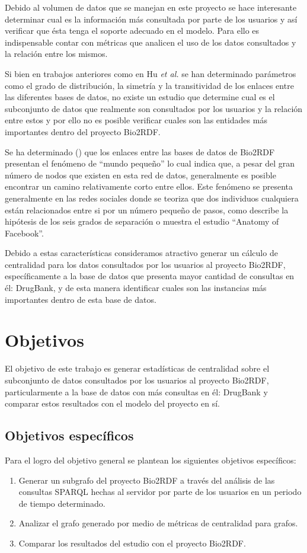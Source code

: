 Debido al volumen de datos que se manejan en este proyecto se hace interesante
determinar cual es la información más consultada por parte de los usuarios y 
así verificar que ésta tenga el soporte adecuado en el modelo. 
Para ello es indispensable contar con métricas que analicen el uso de los datos
consultados y la relación entre los mismos.

Si bien en trabajos anteriores como en Hu \emph{et al.}\cite{hu2015link} se han
determinado parámetros como el grado de distribución, la simetría y la
transitividad de los enlaces entre las diferentes bases de datos, no existe un
estudio que determine cual es el subconjunto de datos que realmente son
consultados por los usuarios y la relación entre estos y por ello no es posible
verificar cuales son las entidades más importantes dentro del proyecto Bio2RDF.

Se ha determinado (\hspace{1sp}\cite{hu2015link}) que los enlaces entre
las bases de datos de Bio2RDF presentan el fenómeno de ``mundo pequeño'' lo cual
indica que, a pesar del gran número de nodos que existen en esta red de datos,
generalmente es posible encontrar un camino relativamente corto entre ellos.
Este fenómeno se presenta generalmente en las redes sociales donde se
teoriza que dos individuos cualquiera están relacionados entre si por un número
pequeño de pasos, como describe la hipótesis de los seis grados de separación o
muestra el estudio ``Anatomy of Facebook''\cite{ugander2011anatomy}.

Debido a estas características consideramos atractivo generar un cálculo de
centralidad para los datos consultados por los usuarios al proyecto Bio2RDF,
específicamente a la base de datos que presenta mayor cantidad de consultas en
él: DrugBank, y de esta manera identificar cuales son las instancias más
importantes dentro de esta base de datos.

\section{Objetivos}

El objetivo de este trabajo es generar estadísticas de centralidad sobre el
subconjunto de datos consultados por los usuarios al proyecto Bio2RDF,
particularmente a la base de datos con más consultas en él: DrugBank y comparar
estos resultados con el modelo del proyecto en sí.

\subsection{Objetivos específicos}
Para el logro del objetivo general se plantean los siguientes objetivos
específicos:
\begin{enumerate}
  \item
    Generar un subgrafo del proyecto Bio2RDF a través del análisis de las
    consultas SPARQL hechas al servidor por parte de los usuarios en un periodo
    de tiempo determinado.
  \item
    Analizar el grafo generado por medio de métricas de centralidad para grafos.
  \item
    Comparar los resultados del estudio con el proyecto Bio2RDF.
\end{enumerate}
